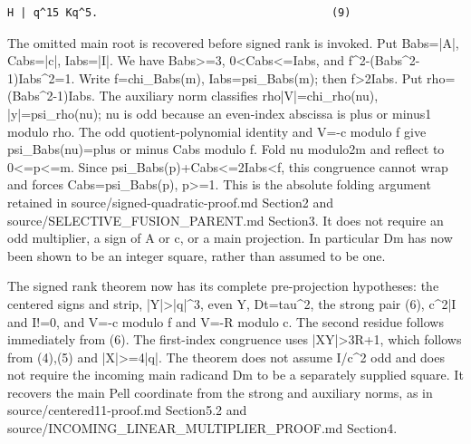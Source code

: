 \begin{verbatim}
H | q^15 Kq^5.                                    (9)
\end{verbatim}

The omitted main root is recovered before signed rank is invoked. Put Babs=\allowbreak{}|A|, Cabs=\allowbreak{}|c|, Iabs=\allowbreak{}|I|. We have Babs\textgreater{}\allowbreak{}=\allowbreak{}3, 0\textless{}\allowbreak{}Cabs\textless{}\allowbreak{}=\allowbreak{}Iabs, and f\textasciicircum{}\allowbreak{}2-(Babs\textasciicircum{}\allowbreak{}2-1)Iabs\textasciicircum{}\allowbreak{}2=\allowbreak{}1. Write f=\allowbreak{}chi\_\allowbreak{}Babs(m), Iabs=\allowbreak{}psi\_\allowbreak{}Babs(m); then f\textgreater{}\allowbreak{}2Iabs. Put rho=\allowbreak{}(Babs\textasciicircum{}\allowbreak{}2-1)Iabs. The auxiliary norm classifies rho|V|=\allowbreak{}chi\_\allowbreak{}rho(nu), |y|=\allowbreak{}psi\_\allowbreak{}rho(nu); nu is odd because an even-index abscissa is plus or minus1 modulo rho. The odd quotient-polynomial identity and V=\allowbreak{}-c modulo f give psi\_\allowbreak{}Babs(nu)=\allowbreak{}plus or minus Cabs modulo f. Fold nu modulo2m and reflect to 0\textless{}\allowbreak{}=\allowbreak{}p\textless{}\allowbreak{}=\allowbreak{}m. Since psi\_\allowbreak{}Babs(p)+\allowbreak{}Cabs\textless{}\allowbreak{}=\allowbreak{}2Iabs\textless{}\allowbreak{}f, this congruence cannot wrap and forces Cabs=\allowbreak{}psi\_\allowbreak{}Babs(p), p\textgreater{}\allowbreak{}=\allowbreak{}1. This is the absolute folding argument retained in source/\allowbreak{}signed-quadratic-proof.md Section2 and source/\allowbreak{}SELECTIVE\_\allowbreak{}FUSION\_\allowbreak{}PARENT.md Section3. It does not require an odd multiplier, a sign of A or c, or a main projection. In particular Dm has now been shown to be an integer square, rather than assumed to be one.



The signed rank theorem now has its complete pre-projection hypotheses: the centered signs and strip, |Y|\textgreater{}\allowbreak{}|q|\textasciicircum{}\allowbreak{}3, even Y, Dt=\allowbreak{}tau\textasciicircum{}\allowbreak{}2, the strong pair (6), c\textasciicircum{}\allowbreak{}2|I and I!=\allowbreak{}0, and V=\allowbreak{}-c modulo f and V=\allowbreak{}-R modulo c. The second residue follows immediately from (6). The first-index congruence uses |XY|\textgreater{}\allowbreak{}3R+\allowbreak{}1, which follows from (4),(5) and |X|\textgreater{}\allowbreak{}=\allowbreak{}4|q|. The theorem does not assume I/\allowbreak{}c\textasciicircum{}\allowbreak{}2 odd and does not require the incoming main radicand Dm to be a separately supplied square. It recovers the main Pell coordinate from the strong and auxiliary norms, as in source/\allowbreak{}centered11-proof.md Section5.2 and source/\allowbreak{}INCOMING\_\allowbreak{}LINEAR\_\allowbreak{}MULTIPLIER\_\allowbreak{}PROOF.md Section4.




